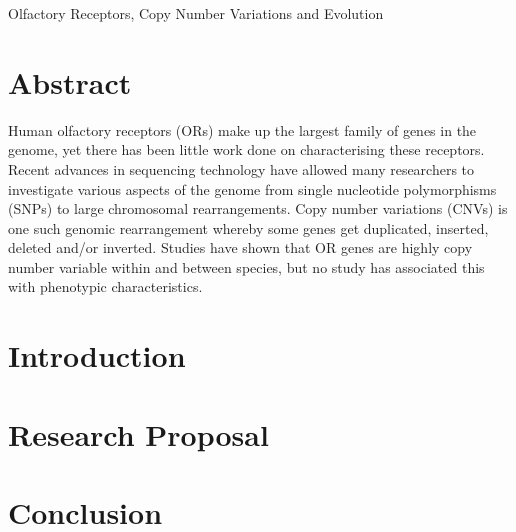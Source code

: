 \documentclass[a4paper, 12pt]{article}
\begin{document}
\begin{center}
\large{Olfactory Receptors, Copy Number Variations and Evolution}
\end{center}

\section*{\normalsize{Abstract}}

Human olfactory receptors (ORs) make up the largest family of genes in the genome, yet there has been little work done on characterising these receptors.
Recent advances in sequencing technology have allowed many researchers to investigate various aspects of the genome from single nucleotide polymorphisms (SNPs) to large chromosomal rearrangements.
Copy number variations (CNVs) is one such genomic rearrangement whereby some genes get duplicated, inserted, deleted and/or inverted.
Studies have shown that OR genes are highly copy number variable within and between species, but no study has associated this with phenotypic characteristics.

\section*{Introduction}

\section*{Research Proposal}

\section*{Conclusion}
\end{document}
